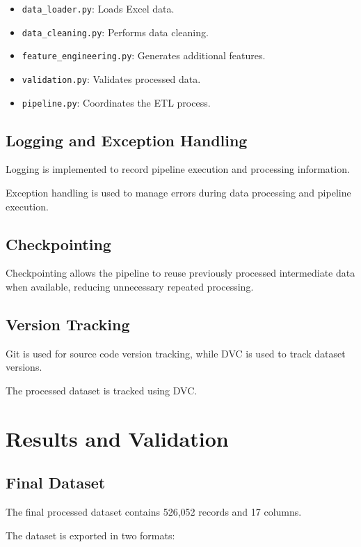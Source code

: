 \documentclass[12pt,a4paper]{report}
\begin{document}
\begin{itemize}
    \item \texttt{data\_loader.py}: Loads Excel data.
    \item \texttt{data\_cleaning.py}: Performs data cleaning.
    \item \texttt{feature\_engineering.py}: Generates
    additional features.
    \item \texttt{validation.py}: Validates processed data.
    \item \texttt{pipeline.py}: Coordinates the ETL process.
\end{itemize}

\section{Logging and Exception Handling}

Logging is implemented to record pipeline execution
and processing information.

Exception handling is used to manage errors during
data processing and pipeline execution.

\section{Checkpointing}

Checkpointing allows the pipeline to reuse previously
processed intermediate data when available, reducing
unnecessary repeated processing.

\section{Version Tracking}

Git is used for source code version tracking, while
DVC is used to track dataset versions.

The processed dataset is tracked using DVC.

\chapter{Results and Validation}

\section{Final Dataset}

The final processed dataset contains 526,052 records
and 17 columns.

The dataset is exported in two formats:
\end{document}
